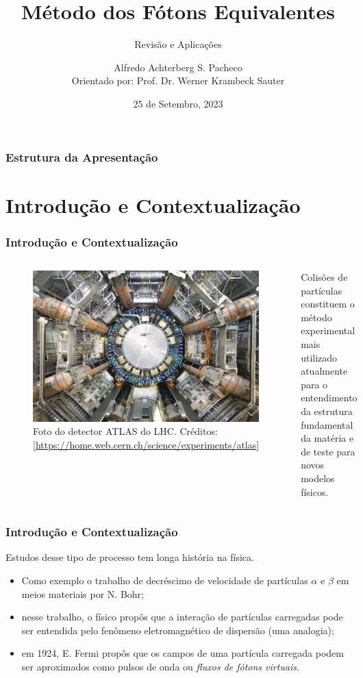 \documentclass[xcolor=dvipsnames]{beamer}
\title{Método dos Fótons Equivalentes}
\subtitle{Revisão e Aplicações}
\author[A. A. S. Pacheco]{
	Alfredo Achterberg S. Pacheco\\
	{\footnotesize Orientado por: Prof.  Dr. Werner Krambeck Sauter}
}
\institute[IFM - UFPel]{
	Instituto de Física e Matemática - Universidade Federal de Pelotas
}
\date[25 de set., 2023]{25 de Setembro, 2023}
\begin{document}
\frame{\titlepage}

\begin{frame}
\frametitle{Estrutura da Apresentação}
\tableofcontents
\end{frame}

\section{Introdução e Contextualização}

\begin{frame}
	\frametitle{Introdução e Contextualização}

	\begin{columns}
		\begin{figure}
			\includegraphics[width=\columnwidth]{./figs/atlan_normal.jpg}
			\caption{Foto do detector ATLAS do LHC. {\scriptsize Créditos:
			[\url{https://home.web.cern.ch/science/experiments/atlas}]}}
		\end{figure}
	
		Colisões de partículas constituem o método experimental mais utilizado
		atualmente para o entendimento da estrutura fundamental da matéria e de
		teste para novos modelos físicos.
	\end{columns}

\end{frame}

\begin{frame}
	\frametitle{Introdução e Contextualização}
	Estudos desse tipo de processo tem longa história na física.
	\begin{itemize}
		\item Como exemplo o trabalho de decréscimo de velocidade de partículas
			$\alpha$ e $\beta$ em meios materiais por N. Bohr;
		\item nesse trabalho, o físico propôs que a interação de partículas
			carregadas pode ser entendida pelo fenômeno eletromagnético de
			dispersão (uma analogia);
		\item em 1924, E. Fermi propôs que os campos de uma partícula carregada
			podem ser aproximados como pulsos de onda ou \textit{fluxos de
			fótons virtuais.}
	\end{itemize}
\end{frame}
\end{document}

